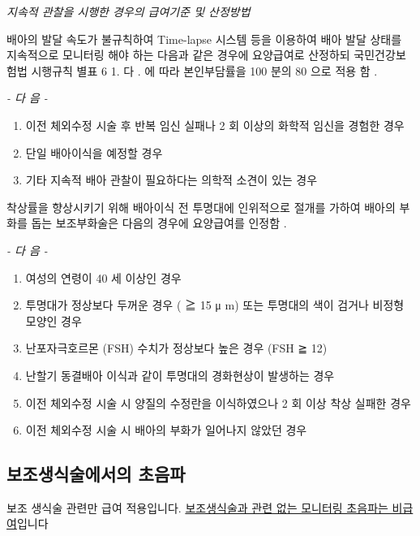 \emph{지속적 관찰을 시행한 경우의 급여기준 및 산정방법} \par
배아의 발달 속도가 불규칙하여  Time-lapse  시스템 등을 이용하여 배아 발달 상태를 지속적으로 모니터링 해야 하는 다음과  같은 경우에 요양급여로 산정하되 국민건강보험법 시행규칙 별표 6 1. 다 . 에  따라 본인부담률을  100 분의  80 으로 적용 함 . \par
\emph{-  다 음  -}\par 
\begin{enumerate}[가.]\tightlist
\item 이전 체외수정 시술 후 반복 임신 실패나  2 회 이상의 화학적  임신을 경험한 경우 
\item 단일 배아이식을 예정할 경우 
\item 기타 지속적 배아 관찰이 필요하다는 의학적 소견이 있는 경우 
\end{enumerate} 

\par 
착상률을 향상시키기 위해 배아이식 전 투명대에 인위적으로  절개를 가하여 배아의 부화를 돕는 보조부화술은  다음의 경우에 요양급여를 인정함 . \par
\emph{-  다 음  -}\par  
\begin{enumerate}[가.]\tightlist
\item 여성의 연령이  40 세 이상인 경우 
\item 투명대가 정상보다 두꺼운 경우 ( ≧ 15 μ m)  또는 투명대의 색이 검거나 비정형 모양인 경우 
\item 난포자극호르몬 (FSH)  수치가 정상보다 높은 경우 (FSH ≧ 12) 
\item 난할기 동결배아 이식과 같이 투명대의 경화현상이 발생하는 경우 
\item 이전 체외수정 시술 시 양질의 수정란을 이식하였으나  2 회  이상 착상 실패한 경우 
\item 이전 체외수정 시술 시 배아의 부화가 일어나지 않았던 경우
\end{enumerate} 

\subsection{보조생식술에서의 초음파}
보조 생식술 관련만 급여 적용입니다. \uline{보조생식술과 관련 없는 모니터링 초음파는 비급여}입니다

